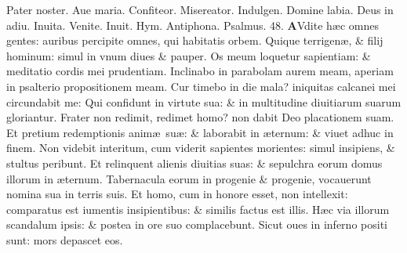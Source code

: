\documentclass[a5paper,10pt]{book}
\def\ae{æ}
\begin{document}
\begin{multicols*}{2}
\begin{center}
\end{center}
\vspace{-1em}
\par \noindent \color{red} P\color{black}ater noster. Aue maria. Confiteor. Misereator. Indulgen. Domine labia. Deus in adiu. \color{red} Inuita. \color{black} Venite. \color{red} Inuit. Hym. Antiphona. \quad Psalmus. 48. \color{black}
\lettrine[lines=2]{\bfseries \color{red} A}{}Vdite h\ae c omnes gentes: auribus percipite omnes, qui habitatis orbem.
\newline \color{red} Q\color{black}uique terrigen\ae , \& filij hominum: simul in vnum diues \& pauper.
\newline \color{red} O\color{black}s meum loquetur sapientiam: \& meditatio cordis mei prudentiam.
\newline \color{red} I\color{black}nclinabo in parabolam aurem meam, aperiam in psalterio propositionem meam.
\newline \color{red} C\color{black}ur timebo in die mala? iniquitas calcanei mei circundabit me:
\newline \color{red} Q\color{black}ui confidunt in virtute sua: \& in multitudine diuitiarum suarum gloriantur.
\newline \color{red} F\color{black}rater non redimit, redimet homo? non dabit Deo placationem suam.
\newline \color{red} E\color{black}t pretium redemptionis anim\ae \ su\ae : \& laborabit in \ae ternum: \& viuet adhuc in finem.
\newline \color{red} N\color{black}on videbit interitum, cum viderit sapientes morientes: simul insipiens, \& stultus peribunt.
\newline \color{red} E\color{black}t relinquent alienis diuitias suas: \& sepulchra eorum domus illorum in \ae ternum.
\newline \color{red} T\color{black}abernacula eorum in progenie \& progenie, vocauerunt nomina sua in terris suis.
\newline \color{red} E\color{black}t homo, cum in honore esset, non intellexit: comparatus est iumentis insipientibus: \& similis factus est illis.
\newline \color{red} H\color{black}\ae c via illorum scandalum ipsis: \& postea in ore suo complacebunt.
\newline \color{red} S\color{black}icut oues in inferno positi sunt: mors depascet eos.

\end{multicols*}
\end{document}

